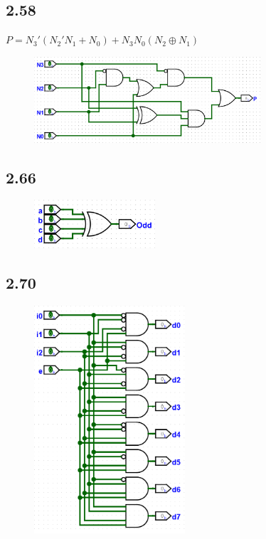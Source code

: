 \documentclass{article}
\begin{document}
\newpage
\subsection*{2.58}
$P = N_3'(N_2' N_1 + N_0) + N_3 N_0 (N_2 \oplus N_1)$
\begin{figure}[H]
    \centering
    \includegraphics[width=0.75\textwidth]{./images/2_58.png}
\end{figure}

\subsection*{2.66}
\begin{figure}[H]
    \centering
    \includegraphics[width=0.4\textwidth]{./images/2_66.png}
\end{figure}

\subsection*{2.70}
\begin{figure}[H]
    \centering
    \includegraphics[width=0.5\textwidth]{./images/2_70.png}
\end{figure}
\end{document}
